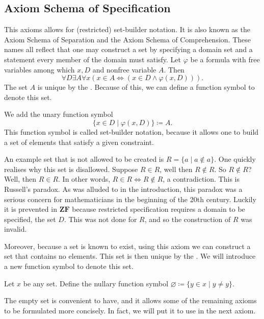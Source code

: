 \documentclass[../main.tex]{subfiles}
\begin{document}
\subsection*{Axiom Schema of Specification}\label{subsec:zermelo_fraenkel_set_theory:axiom_schema_of_specification}
This axioms allows for (restricted) set-builder notation. It is also known as the Axiom Schema of Separation and the Axiom Schema of Comprehension. These names all reflect that one may construct a set by specifying a domain set and a statement every member of the domain must satisfy. Let $\varphi$ be a formula with free variables among which $x,D$ and nonfree variable $A$. Then
\begin{equation*}
    \forall D\exists A\forall x(x\in A\iff(x\in D\land\varphi(x,D))).
\end{equation*}
The set $A$ is unique by the . Because of this, we can define a function symbol to denote this set.
\begin{definition}
    We add the unary function symbol
    \begin{equation*}
        \{x\in D\mid\varphi(x,D)\}\coloneq A.
    \end{equation*}
    This function symbol is called set-builder notation, because it allows one to build a set of elements that satisfy a given constraint.
\end{definition}
An example set that is not allowed to be created is $R=\{a\mid a\notin a\}$. One quickly realises why this set is disallowed. Suppose $R\in R$, well then $R\notin R$. So $R\notin R$? Well, then $R\in R$. In other words, $R\in R\iff R\notin R$, a contradiction. This is Russell's paradox. As was alluded to in the introduction, this paradox was a serious concern for mathematicians in the beginning of the 20th century. Luckily it is prevented in $\mathbf{ZF}$ because restricted specification requires a domain to be specified, the set $D$. This was not done for $R$, and so the construction of $R$ was invalid.

Moreover, because a set is known to exist, using this axiom we can construct a set that contains no elements. This set is then unique by the . We will introduce a new function symbol to denote this set.
\begin{definition}
    Let $x$ be any set. Define the nullary function symbol $\varnothing\coloneq\{y\in x\mid y\neq y\}$.
\end{definition}
The empty set is convenient to have, and it allows some of the remaining axioms to be formulated more concisely. In fact, we will put it to use in the next axiom.
\end{document}
